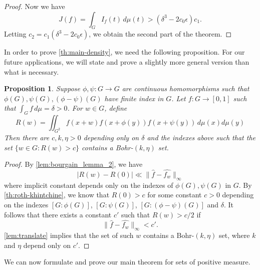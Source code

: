 \documentclass[10pt]{article}
\newtheorem{proposition}[proposition]{Proposition}
\theoremstyle{definition}
\begin{document}
\begin{proof}
    Now we have
    \begin{equation*}
        J(f) = \int_G I_f(t) \, d\mu(t) > (\delta^3 - 2 c_0 \epsilon) c_1.
    \end{equation*}
    Letting $c_2 = c_1(\delta^3 - 2c_0 \epsilon)$, we obtain the second part of the theorem. 
\end{proof}


In order to prove \cref{th:main-density}, we need the following proposition. For our future applications, we will state and prove a slightly more general version than what is necessary.


\begin{proposition}
\label{prop:density-bohr-stronger}
Suppose $\phi, \psi: G \rightarrow G$ are continuous homomorphisms such that $\phi(G), \psi(G), (\phi-\psi)(G)$ have finite index in $G$. Let $f : G \rightarrow [0,1]$ such that $\int_G f \, d\mu = \delta >0$. For $w \in G$, define
\[
    R(w) = \iint_{G^2} f(x + w) f(x + \phi(y)) f(x+\psi(y))  \, d\mu(x) d\mu(y)
\]
Then there are $c, k, \eta >0$ depending only on $\delta$ and the indexes above such that the set
 $\{ w \in G: R(w) > c\}$ contains a Bohr-$(k,\eta)$ set. 
\end{proposition}


\begin{proof}
By \cref{lem:bourgain_lemma_2}, we have
\[
    |R(w) - R(0)| \ll \lVert \hat{f} - \widehat{f_w} \rVert_{\infty}
\]
where implicit constant depends only on the indexes of $\phi(G), \psi(G)$ in $G$. 
By \cref{th:roth-khintchine}, we know that $R(0) > c$ for some constant $c>0$ depending on the indexes $[G: \phi(G)]$, $[G: \psi(G)]$, $[G: (\phi - \psi)(G)]$ and $\delta$. It follows that there exists a constant $c'$ such that $R(w) > c/2$ if 
\begin{equation}
    \lVert \hat{f} - \widehat{f_w} \rVert_{\infty} < c'.
\end{equation}
\cref{lem:translate} implies that the set of such $w$ contains a Bohr-$(k,\eta)$ set, where $k$ and $\eta$ depend only on $c'$.
\end{proof}

We can now formulate and prove our main theorem for sets of positive measure.
\end{document}
